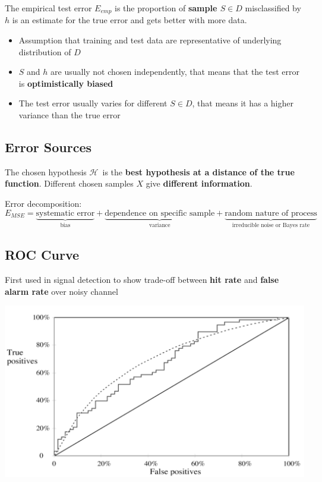 \documentclass[11pt]{article}
\theoremstyle{definition}
\newcommand*\Hilbert{\ensuremath{\mathcal{H}}}
\begin{document}
The empirical test error $E_{emp}$ is the proportion of \textbf{sample $S\in D$} misclassified by $h$ is an estimate for the true error and gets better with more data.

\begin{itemize}
	\item Assumption that training and test data are representative of underlying distribution of $D$
	\item $S$ and $h$ are usually not chosen independently, that means that the test error is \textbf{optimistically biased}
	\item The test error usually varies for different $S\in D$, that means it has a higher variance than the true error
\end{itemize}

\subsection{Error Sources}

The chosen hypothesis \Hilbert\ is the \textbf{best hypothesis at a distance of the true function}. Different chosen samples $X$ give \textbf{different information}.

\noindent
Error decomposition:
\begin{equation*}
	E_{MSE} = \underbrace{\text{systematic error}}_{\text{bias}} + \underbrace{\text{dependence on specific sample}}_{\text{variance}}  + \underbrace{\text{random nature of process}}_{\text{irreducible noise or Bayes rate}}
\end{equation*}

\subsection{ROC Curve}
First used in signal detection to show trade-off between \textbf{hit rate} and \textbf{false alarm rate} over noisy channel

\begin{center}
	\includegraphics[width=0.7\linewidth]{img/ROC_curve}
\end{center}
\end{document}
